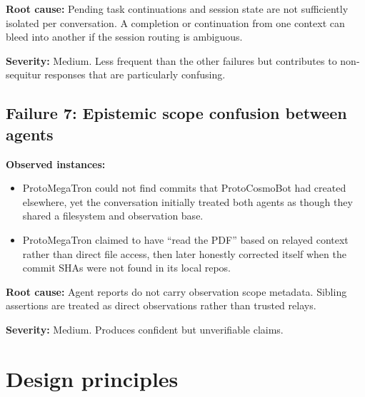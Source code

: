 \documentclass[11pt]{article}
\begin{document}
\textbf{Root cause:} Pending task continuations and session state are not
sufficiently isolated per conversation.  A completion or continuation from one
context can bleed into another if the session routing is ambiguous.

\textbf{Severity:} Medium.  Less frequent than the other failures but
contributes to non-sequitur responses that are particularly confusing.

\subsection{Failure 7: Epistemic scope confusion between agents}

\textbf{Observed instances:}
\begin{itemize}
\item ProtoMegaTron could not find commits that ProtoCosmoBot had created
elsewhere, yet the conversation initially treated both agents as though they
shared a filesystem and observation base.
\item ProtoMegaTron claimed to have ``read the PDF'' based on relayed context
rather than direct file access, then later honestly corrected itself when the
commit SHAs were not found in its local repos.
\end{itemize}

\textbf{Root cause:} Agent reports do not carry observation scope metadata.
Sibling assertions are treated as direct observations rather than trusted
relays.

\textbf{Severity:} Medium.  Produces confident but unverifiable claims.

\section{Design principles}
\end{document}
